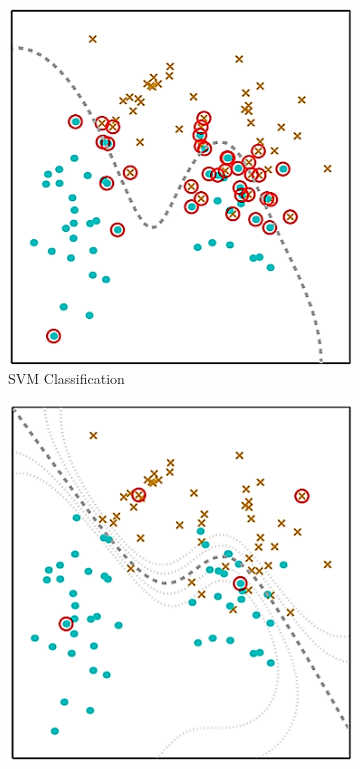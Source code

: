 \begin{figure}
	\centering
		\begin{subfigure}{.5\textwidth}
			\centering
			\includegraphics[width=1\linewidth]{figures/SVMModel.png}
			\caption{SVM Classification\label{FigSVMModel}}
		\end{subfigure}%
		\begin{subfigure}{.5\textwidth}
			\centering
			\includegraphics[width=1\linewidth]{figures/RVMModel.png}

\end{subfigure}
\end{figure}
